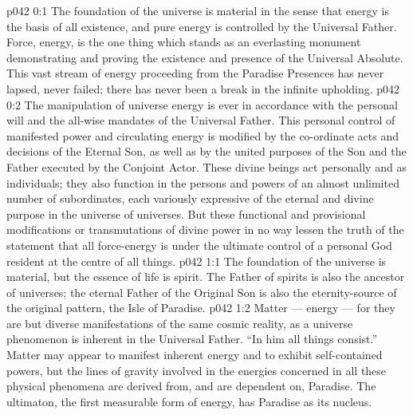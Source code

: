 \author{Mighty Messenger}
\vs p042 0:1 The foundation of the universe is material in the sense that energy is the basis of all existence, and pure energy is controlled by the Universal Father. Force, energy, is the one thing which stands as an everlasting monument demonstrating and proving the existence and presence of the Universal Absolute. This vast stream of energy proceeding from the Paradise Presences has never lapsed, never failed; there has never been a break in the infinite upholding.
\vs p042 0:2 The manipulation of universe energy is ever in accordance with the personal will and the all\hyp{}wise mandates of the Universal Father. This personal control of manifested power and circulating energy is modified by the co\hyp{}ordinate acts and decisions of the Eternal Son, as well as by the united purposes of the Son and the Father executed by the Conjoint Actor. These divine beings act personally and as individuals; they also function in the persons and powers of an almost unlimited number of subordinates, each variously expressive of the eternal and divine purpose in the universe of universes. But these functional and provisional modifications or transmutations of divine power in no way lessen the truth of the statement that all force\hyp{}energy is under the ultimate control of a personal God resident at the centre of all things.
\vs p042 1:1 The foundation of the universe is material, but the essence of life is spirit. The Father of spirits is also the ancestor of universes; the eternal Father of the Original Son is also the eternity\hyp{}source of the original pattern, the Isle of Paradise.
\vs p042 1:2 Matter --- energy --- for they are but diverse manifestations of the same cosmic reality, as a universe phenomenon is inherent in the Universal Father. “In him all things consist.” Matter may appear to manifest inherent energy and to exhibit self\hyp{}contained powers, but the lines of gravity involved in the energies concerned in all these physical phenomena are derived from, and are dependent on, Paradise. The ultimaton, the first measurable form of energy, has Paradise as its nucleus.
